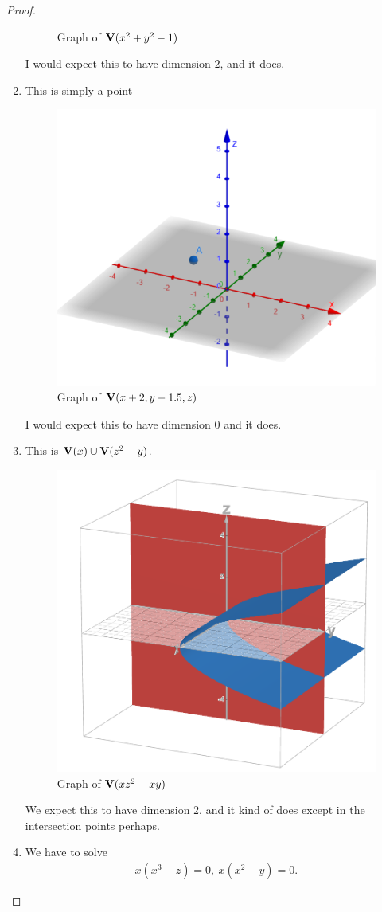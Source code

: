 \begin{proof}
\begin{enumerate}
\begin{figure}[H]
            \caption{Graph of $\mathbf{V}(x^2+y^2-1)$}
            \label{fig:sec1-2-ex4b}
        \end{figure}
        I would expect this to have dimension $2$, and it does.
        \item This is simply a point
        \begin{figure}[H]
            \centering
            \includegraphics[width=0.5\linewidth]{cox-little-oshea/assets/sec1-2-ex4c.png}
            \caption{Graph of $\mathbf{V}(x+2, y-1.5, z)$}
            \label{fig:sec1-2-ex4c}
        \end{figure}
        I would expect this to have dimension $0$ and it does.
        \item This is $\mathbf{V}(x)\cup \mathbf{V}(z^2 - y)$. 
        \begin{figure}[H]
            \centering
            \includegraphics[width=0.5\linewidth]{cox-little-oshea/assets/sec1-2-ex4d.png}
            \caption{Graph of $\mathbf{V}(xz^2 - xy)$}
            \label{fig:sec1-2-ex4d}
        \end{figure}
        We expect this to have dimension $2$, and it kind of does except in the intersection points perhaps.
        \item We have to solve
        \begin{align*}
          x(x^3 - z) = 0,~x(x^2 - y) = 0.  
        \end{align*}

\end{enumerate}
\end{proof}
